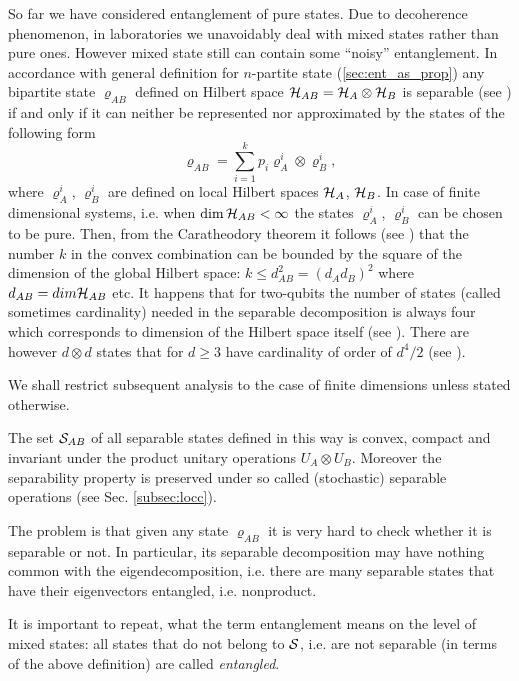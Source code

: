 \documentclass[twocolumn,aps,rmp]{revtex4}
\begin{document}
So far we have considered entanglement of pure states. Due to
decoherence phenomenon, in laboratories we unavoidably deal with mixed
states rather than pure ones. However mixed state still can contain
some ``noisy'' entanglement. In accordance with general definition for
$n$-partite state (\ref{sec:ent_as_prop}) any bipartite state $
\varrho_{AB}$ defined on Hilbert space ${\cal H}_{AB}={\cal H}_{A}
\otimes {\cal H}_{B}$ is separable (see \cite{Werner1989}) if and only
if it can neither be represented nor approximated by the states of the
following form
\begin{equation}
\varrho_{AB} = \sum_{i=1}^{k} p_{i} \varrho_{A}^{i} \otimes
\varrho_{B}^{i},
\label{eq:sep_def}
\end{equation}
where $\varrho_{A}^{i}$, $\varrho_{B}^{i}$ are defined on local
Hilbert spaces ${\cal H}_{A}$, ${\cal H}_{B}$. In case of finite
dimensional systems, i.e. when $\dim{\cal H}_{AB} < \infty $ the
states $\varrho_{A}^{i}$, $\varrho_{B}^{i}$ can be chosen to be
pure. Then, from the Caratheodory theorem it follows (see
\cite{Pawel97,PlenioVedral1998}) that the number $k$ in the convex
combination can be bounded by the square of the dimension of the
global Hilbert space: $k\leq d_{AB}^{2}=(d_{A}d_{B})^{2}$ where
$d_{AB}=dim{\cal H}_{AB}$ etc. It happens that for two-qubits the
number of states (called sometimes cardinality) needed in the
separable decomposition is always four which corresponds to dimension
of the Hilbert space itself (see
\cite{SanperaTarrachVidal,Wootters-conc}). There are however $d
\otimes d$ states that for $d\ge3$ have cardinality of order of
$d^{4}/2$ (see \cite{Barely}).

We shall restrict subsequent analysis to the case of finite
dimensions unless stated otherwise.

The set ${\cal S}_{AB}$ of all separable states defined in this way is
convex, compact and invariant under the product unitary operations
$U_{A} \otimes U_{B}$. Moreover the separability property is preserved
under so called (stochastic) separable operations (see Sec.
\ref{subsec:locc}).

The problem is that given any state $\varrho_{AB}$ it is very hard to
check whether it is separable or not. In particular, its separable
decomposition may have nothing common with the eigendecomposition,
i.e. there are many separable states that have their eigenvectors
entangled, i.e. nonproduct.

It is important to repeat, what the term entanglement means on the
level of mixed states: all states that do not belong to ${\cal S}$,
i.e.  are not separable (in terms of the above definition) are called
{\it entangled}.
\end{document}
